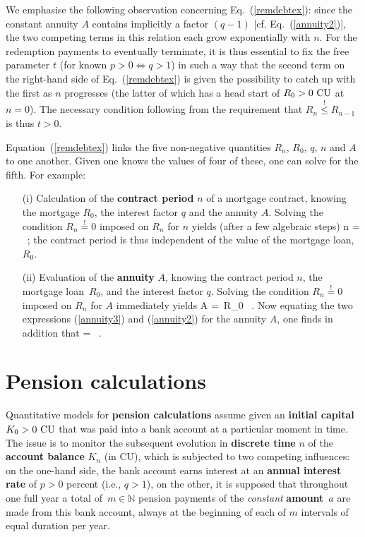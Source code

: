 \medskip
\noindent
We emphasise the following observation concerning 
Eq.~(\ref{remdebtex}): since the constant annuity $A$ contains 
implicitly a factor $(q-1)$ [cf. Eq.~(\ref{annuity2})], the two 
competing terms in this relation each grow exponentially with $n$. 
For the redemption payments to eventually terminate, it is thus 
essential to fix the free parameter $t$ (for known $p>0 
\Leftrightarrow q>1$) in such a way that the second term on the 
right-hand side of Eq.~(\ref{remdebtex}) is given the possibility 
to catch up with the first as $n$ progresses (the latter of which 
has a head start of $R_{0}>0~{\rm CU}$ at $n=0$). The necessary 
condition following from the requirement that $R_{n} 
\stackrel{!}{\leq} R_{n-1}$ is thus $t>0$.

\medskip
\noindent
Equation~(\ref{remdebtex}) links the five non-negative quantities 
$R_{n}$, $R_{0}$, $q$, $n$ and $A$ to one another. Given one knows 
the values of four of these, one can solve for the fifth. For 
example:
%
\begin{itemize}
\item[(i)] Calculation of the {\bf contract period} $n$ of a 
mortgage contract, knowing the mortgage $R_{0}$, the interest 
factor $q$ and the annuity $A$. Solving the condition  $R_{n} 
\stackrel{!}{=} 0$ imposed on $R_{n}$ for $n$ yields (after a few 
algebraic steps)
%
\be
n =  \ ;
\ee
%
the contract period is thus independent of the value of the 
mortgage loan, $R_{0}$.

\item[(ii)] Evaluation of the {\bf annuity} $A$, knowing the 
contract period $n$, the mortgage loan~$R_{0}$, and the interest 
factor $q$. Solving the condition $R_{n} \stackrel{!}{=} 0$ 
imposed on $R_{n}$ for $A$ immediately yields
%
\be
{}
A = \,R_{0} \ .
\ee
%
Now equating the two expressions (\ref{annuity3}) and
(\ref{annuity2}) for the annuity $A$, one finds in addition that
%
\be
{} =  \ .
\ee
%
\end{itemize}
%

\section[Pension calculations]{Pension calculations}
Quantitative models for {\bf pension calculations} assume given an 
{\bf initial capital} $K_{0}>0~{\rm CU}$ that was paid into a bank 
account at a particular moment in time. The issue is to monitor 
the subsequent evolution in {\bf discrete time} $n$ of the {\bf 
account balance} $K_{n}$ (in CU), which is subjected to two 
competing influences: on the one-hand side, the bank account earns 
interest at an {\bf annual interest rate} of $p>0$ percent (i.e., 
$q>1$), on the other, it is supposed that throughout one full year 
a total of~$m \in \mathbb{N}$ pension payments of the 
\emph{constant} {\bf amount}~$a$ are made from this bank account, 
always at the beginning of each of $m$ intervals of equal duration 
per year.

